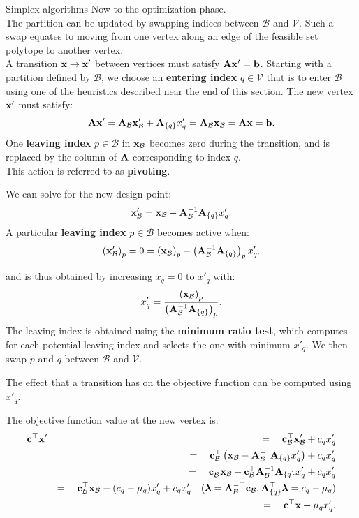 \documentclass[11pt,compress,t,notes=noshow, xcolor=table]{beamer}
\begin{document}
\begin{vbframe}{Simplex algorithms}
Now to the optimization phase.\\
The partition can be updated by swapping indices between $\mathcal{B}$ and $\mathcal{V}$.
Such a swap equates to moving from one vertex along an edge of the feasible set polytope to another vertex.\\
\lz
A transition $ \mathbf{x} \to \mathbf{x}' $ between vertices must satisfy $ \mathbf{A} \mathbf{x}' = \mathbf{b} $. 
Starting with a partition defined by $ \mathcal{B} $, 
we choose an \textbf{entering index} $ q \in \mathcal{V} $ that is to enter $ \mathcal{B} $ using one of the heuristics described near the end of this section. 
The new vertex $ \mathbf{x}' $ must satisfy:
$$
\mathbf{A} \mathbf{x}' = \mathbf{A}_{\mathcal{B}} \mathbf{x}'_{\mathcal{B}} + \mathbf{A}_{\{q\}} x'_q = \mathbf{A}_{\mathcal{B}} \mathbf{x}_{\mathcal{B}} = \mathbf{A} \mathbf{x} = \mathbf{b}.
$$
\lz
One \textbf{leaving index} $ p \in \mathcal{B} $ in $ \mathbf{x}_{\mathcal{B}} $ becomes zero during the transition, and is replaced by the column of $ \mathbf{A} $ corresponding to index $ q $.\\
This action is referred to as \textbf{pivoting}.

\framebreak

We can solve for the new design point:
$$
\mathbf{x}'_{\mathcal{B}} = \mathbf{x}_{\mathcal{B}} - \mathbf{A}_{\mathcal{B}}^{-1} \mathbf{A}_{\{q\}} x'_q.
$$
\lz
A particular \textbf{leaving index} $ p \in \mathcal{B} $ becomes active when:
$$
\left( \mathbf{x}'_{\mathcal{B}} \right)_p = 0 = \left( \mathbf{x}_{\mathcal{B}} \right)_p - \left( \mathbf{A}_{\mathcal{B}}^{-1} \mathbf{A}_{\{q\}} \right)_p x'_q.
$$

and is thus obtained by increasing $ x_q = 0 $ to $ x'_q $ with:
$$x'_q = \frac{\left( \mathbf{x}_{\mathcal{B}} \right)_p}{\left( \mathbf{A}_{\mathcal{B}}^{-1} \mathbf{A}_{\{q\}} \right)_p}.$$
\lz
The leaving index is obtained using the \textbf{minimum ratio test}, which computes for each potential leaving index and selects the one with minimum $ x'_q $. We then swap $ p $ and $ q $ between $ \mathcal{B} $ and $ \mathcal{V} $.

\framebreak


The effect that a transition has on the objective function can be computed using $x'_q$.\\
\lz

The objective function value at the new vertex is:
\begin{eqnarray*}
    \mathbf{c}^\top \mathbf{x}' &&=\quad \mathbf{c}_{\mathcal{B}}^\top \mathbf{x}'_{\mathcal{B}} + c_q x'_q \\
    &&=\quad \mathbf{c}_{\mathcal{B}}^\top \left( \mathbf{x}_{\mathcal{B}} - \mathbf{A}_{\mathcal{B}}^{-1} \mathbf{A}_{\{q\}} x'_q \right) + c_q x'_q \\
    &&=\quad \mathbf{c}_{\mathcal{B}}^\top \mathbf{x}_{\mathcal{B}} - \mathbf{c}_{\mathcal{B}}^\top \mathbf{A}_{\mathcal{B}}^{-1} \mathbf{A}_{\{q\}} x'_q + c_q x'_q \\
    &&=\quad \mathbf{c}_{\mathcal{B}}^\top \mathbf{x}_{\mathcal{B}} - (c_q - \mu_q) x'_q + c_q x'_q \quad (\bm{\lambda} = \mathbf{A}_{\mathcal{B}}^{-\top} \mathbf{c}_{\mathcal{B}}, \mathbf{A}_{\{q\}}^\top\bm{\lambda}=c_q-\mu_q)\\
    &&=\quad \mathbf{c}^\top \mathbf{x} + \mu_q x'_q.
\end{eqnarray*}


\end{vbframe}
\end{document}
